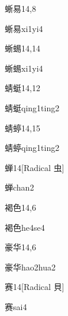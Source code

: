 \begin{entry}{蜥易}{14,8}
  \begin{phonetics}{蜥易}{xi1yi4}
  \end{phonetics}
\end{entry}

\begin{entry}{蜥蜴}{14,14}
  \begin{phonetics}{蜥蜴}{xi1yi4}
  \end{phonetics}
\end{entry}

\begin{entry}{蜻蜓}{14,12}
  \begin{phonetics}{蜻蜓}{qing1ting2}
  \end{phonetics}
\end{entry}

\begin{entry}{蜻蝏}{14,15}
  \begin{phonetics}{蜻蝏}{qing1ting2}
  \end{phonetics}
\end{entry}

\begin{entry}{蝉}{14}[Radical 虫]
  \begin{phonetics}{蝉}{chan2}
  \end{phonetics}
\end{entry}

\begin{entry}{褐色}{14,6}
  \begin{phonetics}{褐色}{he4se4}
  \end{phonetics}
\end{entry}

\begin{entry}{豪华}{14,6}
  \begin{phonetics}{豪华}{hao2hua2}
  \end{phonetics}
\end{entry}

\begin{entry}{赛}{14}[Radical 貝]
  \begin{phonetics}{赛}{sai4}
  \end{phonetics}
\end{entry}

